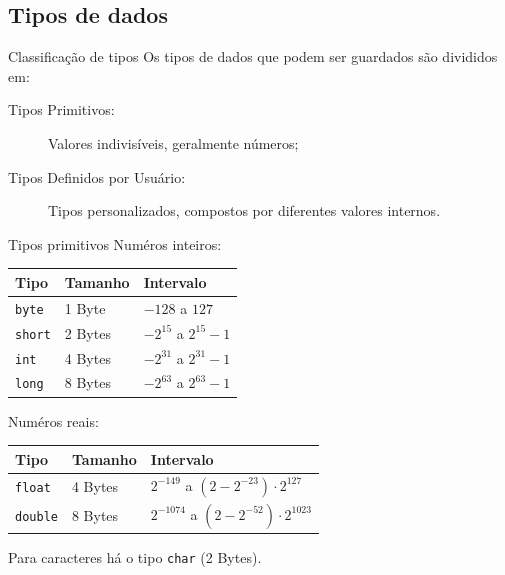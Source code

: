 \documentclass{beamer}
\begin{document}
\subsection{Tipos de dados}
\begin{frame}{Classificação de tipos}
    Os tipos de dados que podem ser guardados são divididos em:

    \begin{description}
        \item[Tipos Primitivos:] Valores indivisíveis, geralmente números;
        \item[Tipos Definidos por Usuário:] Tipos personalizados, compostos por
            diferentes valores internos.
    \end{description}
\end{frame}

\begin{frame}{Tipos primitivos}
    Numéros inteiros:
    \begin{center}
        \begin{tabular}{|l|l|l|}
            \hline Tipo           & Tamanho & Intervalo \\
            \hline \texttt{byte}  & 1 Byte  & $-128$ a $127$ \\
            \hline \texttt{short} & 2 Bytes & $-2^{15}$ a $2^{15}-1$ \\
            \hline \texttt{int}   & 4 Bytes & $-2^{31}$ a $2^{31}-1$ \\
            \hline \texttt{long}  & 8 Bytes & $-2^{63}$ a $2^{63}-1$ \\
            \hline
        \end{tabular}
    \end{center}

    Numéros reais:
    \begin{center}
        \begin{tabular}{|l|l|l|}
            \hline Tipo            & Tamanho & Intervalo \\
            \hline \texttt{float}  & 4 Bytes & $2^{-149}$ a $(2-2^{-23}) \cdot 2^{127}$ \\
            \hline \texttt{double} & 8 Bytes & $2^{-1074}$ a $(2-2^{-52}) \cdot 2^{1023}$ \\
            \hline
        \end{tabular}
    \end{center}

    Para caracteres há o tipo \texttt{char} (2 Bytes).
\end{frame}
\end{document}
